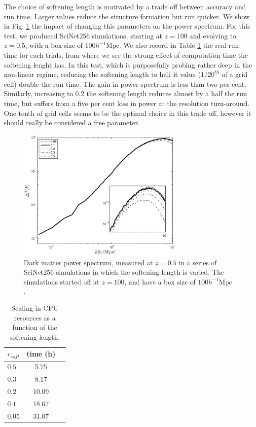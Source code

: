 \documentclass[useAMS,usenatbib]{mn2e}
\begin{document}
The choice of softening length is motivated by a trade off between accuracy and run time.
 Larger values reduce the structure formation but run quicker. 
 We show in Fig. \ref{fig:rsoft} the impact of changing this parameters on the power spectrum.
 For this test, we produced SciNet256 simulations, starting at $z=100$ and evolving to $z=0.5$, with a box size of $100 h^{-1}\mbox{Mpc}$.
 We also record in Table \ref{table:rsoft} the real run time for each trials, from where 
we see the strong effect of computation time the softening lenght has.
In this test, which is purposefully probing rather deep in the non-linear regime, reducing the softening length
to half it value ($1/20^{th}$ of a grid cell) double the run time. The gain in power spectrum is less than two per cent.
Similarly, increasing to $0.2$ the softening length reduces almost by a half the run time, but suffers from a five per cent loss in power at the resolution turn-around.
One tenth of grid cells seems to be the optimal choice in this trade off, however it should really be considered a free parameter.


\begin{figure}%
  \begin{center}
    \includegraphics[width=3.2in]{graphs/power_rsoft.eps}
  \caption{Dark matter power spectrum, measured at $z=0.5$ in a series of SciNet256 simulations in which the softening length is varied.
  The simulations started off at $z= 100$, and have a box size of $100 h^{-1}\mbox{Mpc}$.
    \label{fig:rsoft}}
\end{center}
\end{figure}

\begin{table}
\begin{center}
\caption{Scaling in {\small CPU} resources as a function of the softening length.}
\begin{tabular}{|l|c|c|}
\hline 
$r_{soft}$         & time (h)   \\                 
\hline
 $0.5$ & 5.75 \\
 $0.3$ & 8.17\\
 $0.2$ & 10.09 \\
 $0.1$ & 18.67\\
 $0.05$ & 31.07 \\
\hline
\end{tabular}
\label{table:rsoft}
\end{center}
\end{table}
\end{document}
